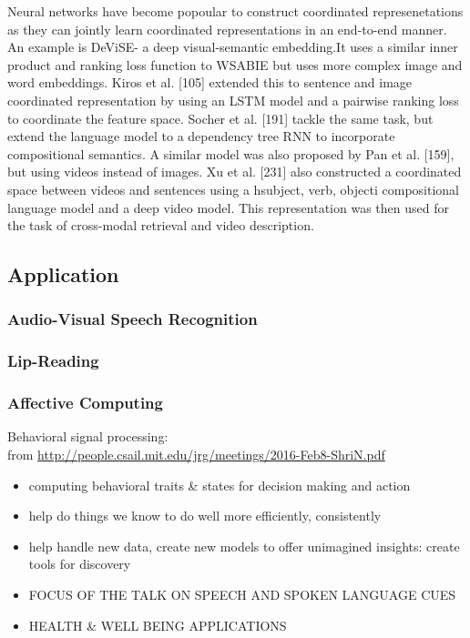 Neural networks have become popoular to construct coordinated represenetations as they can jointly learn coordinated representations in an end-to-end manner. An example is DeViSE- a deep visual-semantic embedding.It uses a similar inner product and ranking loss function to WSABIE but uses more complex image and word embeddings. 
Kiros et al. [105] extended this to
sentence and image coordinated representation by using an LSTM model and a pairwise ranking loss to coordinate the
feature space. Socher et al. [191] tackle the same task, but extend the language model to a dependency tree RNN to incorporate compositional semantics. A similar model was
also proposed by Pan et al. [159], but using videos instead of images. Xu et al. [231] also constructed a coordinated space between videos and sentences using a hsubject, verb,
objecti compositional language model and a deep video model. This representation was then used for the task of cross-modal retrieval and video description.




\subsection{Application}
\subsubsection{Audio-Visual Speech Recognition}


\subsubsection{Lip-Reading}

\subsubsection{Affective Computing}

\cite{Narayanan2013} Behavioral signal processing: \\
from \url{http://people.csail.mit.edu/jrg/meetings/2016-Feb8-ShriN.pdf}\\
\begin{itemize}
    \item computing behavioral traits \& states for decision making and action
    \item help do things we know to do well more efficiently, consistently
    \item help handle new data, create new models to offer unimagined insights: create tools for discovery
    \item FOCUS OF THE TALK ON SPEECH AND SPOKEN LANGUAGE CUES
    \item HEALTH \& WELL BEING APPLICATIONS
\end{itemize}

